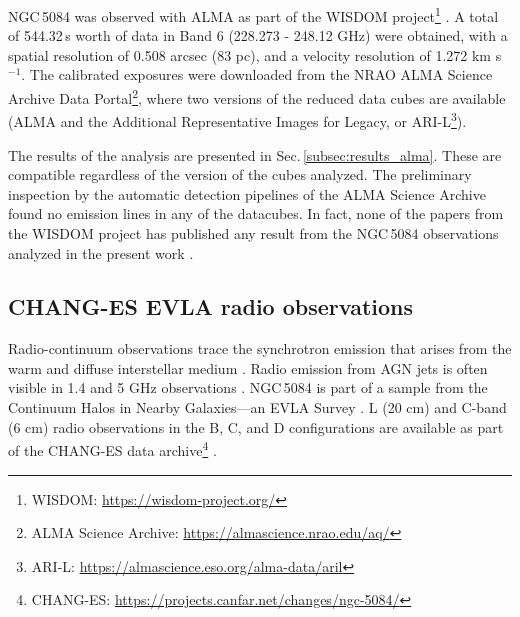 \documentclass[modern]{CORE-AAS/aastex631}
\begin{document}
{NGC\,5084 was observed with ALMA as part of the WISDOM project\footnote{WISDOM: \url{https://wisdom-project.org/}} \citep[Project code: 2015.1.00598.S, PI: Martin Bureau,][]{onishi+2017mnras468_4663}. A total of 544.32\,s worth of data in Band 6 (228.273 - 248.12 GHz) were obtained, with a spatial resolution of 0.508 arcsec (83 pc), and a velocity resolution of 1.272 km s$^{-1}$. The calibrated exposures were downloaded from the NRAO ALMA Science Archive Data Portal\footnote{ALMA Science Archive: \url{https://almascience.nrao.edu/aq/}}, where two versions of the reduced data cubes are available (ALMA and the Additional Representative Images for Legacy, or ARI-L\footnote{ARI-L: \url{https://almascience.eso.org/alma-data/aril}}). \par

The results of the analysis are presented in Sec.\,\ref{subsec:results_alma}. These are compatible regardless of the version of the cubes analyzed. The preliminary inspection by the automatic detection pipelines of the ALMA Science Archive found no emission lines in any of the datacubes. In fact, none of the papers from the WISDOM project has published any result from the NGC\,5084 observations analyzed in the present work \citep{smith+2021mnras500_1933, davis+2022mnras512_1522}. 


\subsection{CHANG-ES EVLA radio observations} \label{subsec:data_radiopol}

Radio-continuum observations trace the synchrotron emission that arises from the warm and diffuse interstellar medium \citep{beck+2013inbook_641}. Radio emission from AGN jets is often visible in 1.4 and 5 GHz observations \citep[20 cm and 6 cm]{sebastian+2019apj883_189, hardcastle+2020na88_101539}. NGC\,5084 is part of a sample from the Continuum Halos in Nearby Galaxies—an EVLA Survey \citep[CHANG-ES][]{irwin+2012aj144_43}. L (20 cm) and C-band (6 cm) radio observations in the B, C, and D configurations are available as part of the CHANG-ES data archive\footnote{CHANG-ES: \url{https://projects.canfar.net/changes/ngc-5084/}} \citep{wiegert+2015aj150_81, irwin+2019aj158_21}. 

}
\end{document}
